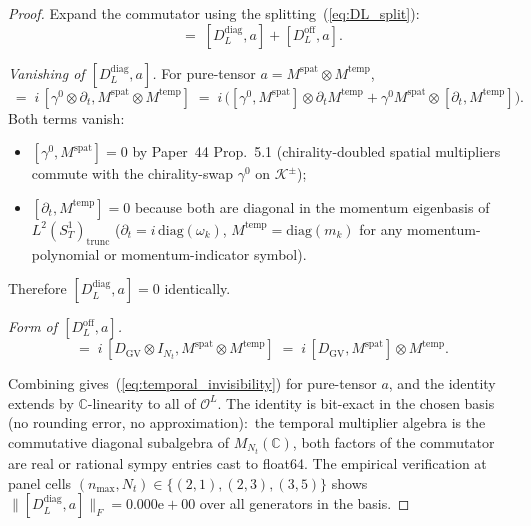 \documentclass[11pt,a4paper]{article}
\theoremstyle{plain}
\theoremstyle{definition}
\newcommand{\nmax}{n_{\max}}
\newcommand{\Nt}{N_{t}}
\newcommand{\SoneT}{S^{1}_{T}}
\newcommand{\Krein}{\mathcal{K}}
\newcommand{\Op}{\mathcal{O}}
\newcommand{\Frob}[1]{\lVert #1 \rVert_{F}}
\newcommand{\C}{\mathbb{C}}
\newcommand{\Mat}{M}
\newcommand{\DGV}{D_{\mathrm{GV}}}
\newcommand{\DL}{D_{L}}
\newcommand{\Ddiag}{D_{L}^{\mathrm{diag}}}
\newcommand{\Doff}{D_{L}^{\mathrm{off}}}
\newcommand{\spat}{\mathrm{spat}}
\newcommand{\temp}{\mathrm{temp}}
\begin{document}
\begin{proof}
Expand the commutator using the splitting~(\ref{eq:DL_split}):
\begin{equation*}
   [\DL, a] \;=\; [\Ddiag, a] + [\Doff, a].
\end{equation*}

\emph{Vanishing of $[\Ddiag, a]$.} For pure-tensor
$a = M^{\spat} \otimes M^{\temp}$,
\begin{equation*}
   [\Ddiag, M^{\spat} \otimes M^{\temp}]
   \;=\; i\,[\gamma^{0} \otimes \partial_{t}, M^{\spat} \otimes M^{\temp}]
   \;=\; i\,\bigl([\gamma^{0}, M^{\spat}] \otimes \partial_{t} M^{\temp}
                  + \gamma^{0} M^{\spat} \otimes [\partial_{t}, M^{\temp}]\bigr).
\end{equation*}
Both terms vanish:
\begin{itemize}
\item $[\gamma^{0}, M^{\spat}] = 0$ by Paper~44 Prop.~5.1 (chirality-doubled
spatial multipliers commute with the chirality-swap $\gamma^{0}$ on
$\Krein^{\pm}$);
\item $[\partial_{t}, M^{\temp}] = 0$ because both are diagonal in the
momentum eigenbasis of $L^{2}(\SoneT)_{\mathrm{trunc}}$
($\partial_{t} = i\,\mathrm{diag}(\omega_{k})$,
$M^{\temp} = \mathrm{diag}(m_{k})$ for any momentum-polynomial or
momentum-indicator symbol).
\end{itemize}
Therefore $[\Ddiag, a] = 0$ identically.

\emph{Form of $[\Doff, a]$.}
\begin{equation*}
   [\Doff, M^{\spat} \otimes M^{\temp}]
   \;=\; i\,[\DGV \otimes I_{\Nt}, M^{\spat} \otimes M^{\temp}]
   \;=\; i\,[\DGV, M^{\spat}] \otimes M^{\temp}.
\end{equation*}

Combining gives~(\ref{eq:temporal_invisibility}) for pure-tensor $a$,
and the identity extends by $\C$-linearity to all of $\Op^{L}$. The
identity is bit-exact in the chosen basis (no rounding error, no
approximation):\ the temporal multiplier algebra is the commutative
diagonal subalgebra of $\Mat_{\Nt}(\C)$, both factors of the commutator
are real or rational sympy entries cast to float64. The empirical
verification at panel cells $(\nmax, \Nt) \in \{(2, 1), (2, 3), (3, 5)\}$
shows $\Frob{[\Ddiag, a]} = 0.000\mathrm{e}{+}00$ over all generators in
the basis. \qedhere
\end{proof}
\end{document}
